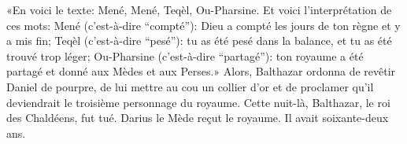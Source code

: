 «En voici le texte: Mené, Mené, Teqèl, Ou-Pharsine.
Et voici l’interprétation de ces mots:
	Mené (c’est-à-dire “compté”):
	Dieu a compté les jours de ton règne et y a mis fin;
	Teqèl (c’est-à-dire “pesé”):
	tu as été pesé dans la balance, et tu as été trouvé trop léger;
	Ou-Pharsine (c’est-à-dire “partagé”):
	ton royaume a été partagé et donné aux Mèdes et aux Perses.»
Alors, Balthazar ordonna de revêtir Daniel de pourpre,
	de lui mettre au cou un collier d’or
	et de proclamer qu’il deviendrait le troisième personnage du royaume.
Cette nuit-là, Balthazar, le roi des Chaldéens, fut tué.
Darius le Mède reçut le royaume. Il avait soixante-deux ans.
